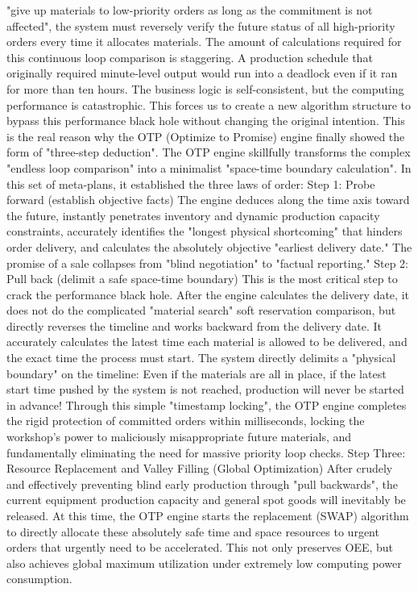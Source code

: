 \documentclass[11pt,a4paper]{article}
\begin{document}
"give up materials to low-priority orders as long as the commitment is not affected", the system must reversely verify the future status of all high-priority orders every time it allocates materials. The amount of calculations required for this continuous loop comparison is staggering. A production schedule that originally required minute-level output would run into a deadlock even if it ran for more than ten hours. The business logic is self-consistent, but the computing performance is catastrophic. This forces us to create a new algorithm structure to bypass this performance black hole without changing the original intention. This is the real reason why the OTP (Optimize to Promise) engine finally showed the form of "three-step deduction". The OTP engine skillfully transforms the complex "endless loop comparison" into a minimalist "space-time boundary calculation". In this set of meta-plans, it established the three laws of order: Step 1: Probe forward (establish objective facts) The engine deduces along the time axis toward the future, instantly penetrates inventory and dynamic production capacity constraints, accurately identifies the "longest physical shortcoming" that hinders order delivery, and calculates the absolutely objective "earliest delivery date." The promise of a sale collapses from "blind negotiation" to "factual reporting." Step 2: Pull back (delimit a safe space-time boundary) This is the most critical step to crack the performance black hole. After the engine calculates the delivery date, it does not do the complicated "material search" soft reservation comparison, but directly reverses the timeline and works backward from the delivery date. It accurately calculates the latest time each material is allowed to be delivered, and the exact time the process must start. The system directly delimits a "physical boundary" on the timeline: Even if the materials are all in place, if the latest start time pushed by the system is not reached, production will never be started in advance! Through this simple "timestamp locking", the OTP engine completes the rigid protection of committed orders within milliseconds, locking the workshop's power to maliciously misappropriate future materials, and fundamentally eliminating the need for massive priority loop checks. Step Three: Resource Replacement and Valley Filling (Global Optimization) After crudely and effectively preventing blind early production through "pull backwards", the current equipment production capacity and general spot goods will inevitably be released. At this time, the OTP engine starts the replacement (SWAP) algorithm to directly allocate these absolutely safe time and space resources to urgent orders that urgently need to be accelerated. This not only preserves OEE, but also achieves global maximum utilization under extremely low computing power consumption.
\end{document}
